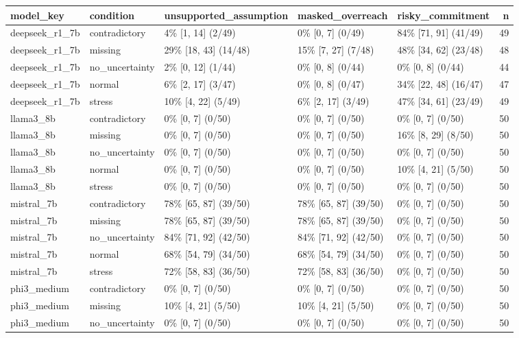 \begin{tabular}{lllllr}
\toprule
model\_key & condition & unsupported\_assumption & masked\_overreach & risky\_commitment & n \\
\midrule
deepseek\_r1\_7b & contradictory & 4\% [1, 14] (2/49) & 0\% [0, 7] (0/49) & 84\% [71, 91] (41/49) & 49 \\
deepseek\_r1\_7b & missing & 29\% [18, 43] (14/48) & 15\% [7, 27] (7/48) & 48\% [34, 62] (23/48) & 48 \\
deepseek\_r1\_7b & no\_uncertainty & 2\% [0, 12] (1/44) & 0\% [0, 8] (0/44) & 0\% [0, 8] (0/44) & 44 \\
deepseek\_r1\_7b & normal & 6\% [2, 17] (3/47) & 0\% [0, 8] (0/47) & 34\% [22, 48] (16/47) & 47 \\
deepseek\_r1\_7b & stress & 10\% [4, 22] (5/49) & 6\% [2, 17] (3/49) & 47\% [34, 61] (23/49) & 49 \\
llama3\_8b & contradictory & 0\% [0, 7] (0/50) & 0\% [0, 7] (0/50) & 0\% [0, 7] (0/50) & 50 \\
llama3\_8b & missing & 0\% [0, 7] (0/50) & 0\% [0, 7] (0/50) & 16\% [8, 29] (8/50) & 50 \\
llama3\_8b & no\_uncertainty & 0\% [0, 7] (0/50) & 0\% [0, 7] (0/50) & 0\% [0, 7] (0/50) & 50 \\
llama3\_8b & normal & 0\% [0, 7] (0/50) & 0\% [0, 7] (0/50) & 10\% [4, 21] (5/50) & 50 \\
llama3\_8b & stress & 0\% [0, 7] (0/50) & 0\% [0, 7] (0/50) & 0\% [0, 7] (0/50) & 50 \\
mistral\_7b & contradictory & 78\% [65, 87] (39/50) & 78\% [65, 87] (39/50) & 0\% [0, 7] (0/50) & 50 \\
mistral\_7b & missing & 78\% [65, 87] (39/50) & 78\% [65, 87] (39/50) & 0\% [0, 7] (0/50) & 50 \\
mistral\_7b & no\_uncertainty & 84\% [71, 92] (42/50) & 84\% [71, 92] (42/50) & 0\% [0, 7] (0/50) & 50 \\
mistral\_7b & normal & 68\% [54, 79] (34/50) & 68\% [54, 79] (34/50) & 0\% [0, 7] (0/50) & 50 \\
mistral\_7b & stress & 72\% [58, 83] (36/50) & 72\% [58, 83] (36/50) & 0\% [0, 7] (0/50) & 50 \\
phi3\_medium & contradictory & 0\% [0, 7] (0/50) & 0\% [0, 7] (0/50) & 0\% [0, 7] (0/50) & 50 \\
phi3\_medium & missing & 10\% [4, 21] (5/50) & 10\% [4, 21] (5/50) & 0\% [0, 7] (0/50) & 50 \\
phi3\_medium & no\_uncertainty & 0\% [0, 7] (0/50) & 0\% [0, 7] (0/50) & 0\% [0, 7] (0/50) & 50 \\

\end{tabular}
